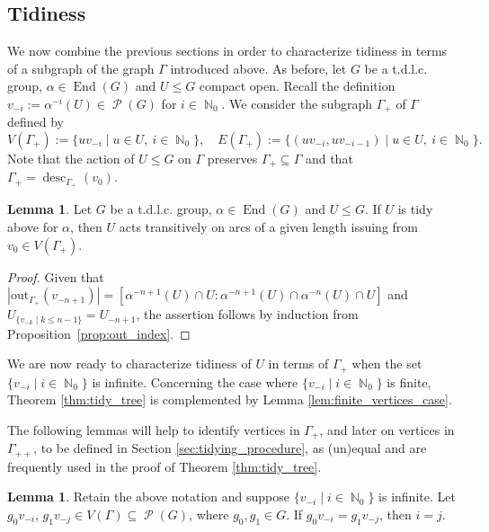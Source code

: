 \documentclass{article}
\DeclareMathOperator\End{End}
\DeclareMathOperator\desc{desc}
\DeclareMathOperator\bbN{\mathbb{N}}
\DeclareMathOperator\calP{\mathcal{P}}
\theoremstyle{definition}
\newtheorem{lemma}[theorem]{Lemma}
\begin{document}
\subsection{Tidiness}\label{sec:tidiness}
We now combine the previous sections in order to characterize tidiness in terms of a subgraph of the graph $\Gamma$ introduced above. As before, let $G$ be a t.d.l.c. group, $\alpha\in\End(G)$ and $U\le G$ compact open.
Recall the definition $v_{-i}:=\alpha^{-i}(U)\in\calP(G)$ for $i\in\bbN_{0}$. We consider the subgraph $\Gamma_{+}$ of $\Gamma$ defined by
\begin{displaymath}
  V(\Gamma_{+}):=\{uv_{-i}\mid u\in U,\ i\in\bbN_{0}\}, \quad E(\Gamma_{+}):=\{(uv_{-i},uv_{-i-1})\mid u\in U,\ i\in\bbN_{0}\}.
\end{displaymath}
Note that the action of $U\le G$ on $\Gamma$ preserves $\Gamma_{+}\subseteq\Gamma$ and that $\Gamma_{+} = \desc_{\Gamma_{+}}(v_{0})$.

\begin{lemma}\label{lem:tidy_above_transitive}
Let $G$ be a t.d.l.c. group, $\alpha\in\End(G)$ and $U\le G$. If $U$ is tidy above for $\alpha$, then $U$ acts transitively on arcs of a given length issuing from $v_{0}\in V(\Gamma_{+})$.
\end{lemma}

\begin{proof}
Given that $|\mathrm{out}_{\Gamma_{+}}(v_{-n+1})|=[\alpha^{-n+1}(U)\cap U:\alpha^{-n+1}(U)\cap\alpha^{-n}(U)\cap U]$ and $U_{\{v_{-k}\mid k\le n-1\}}\!=\!U_{-n+1}$, the assertion follows by induction from Proposition~\ref{prop:out_index}.
\end{proof}

We are now ready to characterize tidiness of $U$ in terms of $\Gamma_{+}$ when the set $\{v_{-i}\mid i\in\bbN_{0}\}$ is infinite. Concerning the case where $\{v_{-i}\mid i\in\bbN_{0}\}$ is finite, Theorem \ref{thm:tidy_tree} is complemented by Lemma \ref{lem:finite_vertices_case}.

The following lemmas will help to identify vertices in $\Gamma_{+}$, and later on vertices in $\Gamma_{++}$, to be defined in Section \ref{sec:tidying_procedure}, as (un)equal and are frequently used in the proof of Theorem \ref{thm:tidy_tree}.
\begin{lemma}\label{lem:equal_vert_in_gamma}
Retain the above notation and suppose $\{v_{-i}\mid i\in\bbN_{0}\}$ is infinite. Let $g_0v_{-i}$, $g_{1}v_{-j}\in V(\Gamma)\subseteq\calP(G)$, where $g_0,g_1\in G$. If $g_{0}v_{-i}=g_{1}v_{-j}$, then $i=j$.
\end{lemma}
\end{document}
